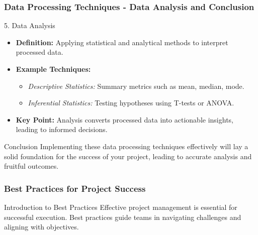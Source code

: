 \documentclass[aspectratio=169]{beamer}
\begin{document}
\begin{frame}[fragile]
    \frametitle{Data Processing Techniques - Data Analysis and Conclusion}
    \begin{block}{5. Data Analysis}
        \begin{itemize}
            \item \textbf{Definition:} Applying statistical and analytical methods to interpret processed data.
            \item \textbf{Example Techniques:}
                \begin{itemize}
                    \item \textit{Descriptive Statistics:} Summary metrics such as mean, median, mode.
                    \item \textit{Inferential Statistics:} Testing hypotheses using T-tests or ANOVA.
                \end{itemize}
            \item \textbf{Key Point:} Analysis converts processed data into actionable insights, leading to informed decisions.
        \end{itemize}
    \end{block}

    \begin{block}{Conclusion}
        Implementing these data processing techniques effectively will lay a solid foundation for the success of your project, leading to accurate analysis and fruitful outcomes.
    \end{block}
\end{frame}

\begin{frame}[fragile]
  \frametitle{Best Practices for Project Success}
  \begin{block}{Introduction to Best Practices}
    Effective project management is essential for 
    successful execution. Best practices guide teams in 
    navigating challenges and aligning with objectives.
  \end{block}
\end{frame}
\end{document}
